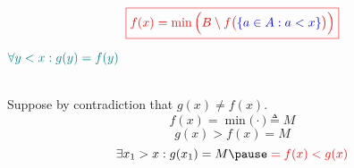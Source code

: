 \begin{frame}{}
  \[
    \textcolor{red}{\boxed{f(x) = \min \Big(B \setminus f\big(\textcolor{blue}{\{a \in A: a < x\}}\big)\Big)}}
  \]
  
  \begin{center}
    $\textcolor{teal}{\forall y < x: g(y) = f(y)}$
    
    \pause
    \vspace{0.80cm}
     \\[8pt] \pause
    Suppose by contradiction that $g(x) \neq f(x)$. \pause
    \[
      f(x) = \min \Big(\cdot\Big) \triangleq M
    \]
    \pause
    \vspace{-0.30cm}
    \[
      g(x) > f(x) = M
    \]
    \pause
    \vspace{-0.30cm}
    \[
      \exists x_1 > x: g(x_1) = M \pause\; \red{= f(x) < g(x)}
    \]
  \end{center}
\end{frame}
